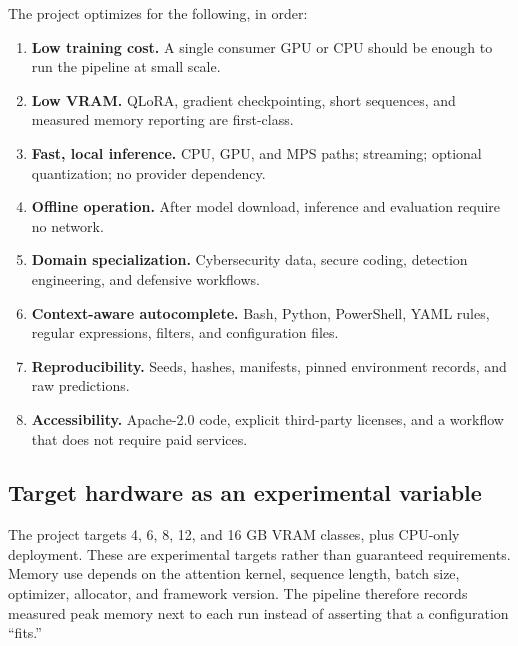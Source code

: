 The project optimizes for the following, in order:

\begin{enumerate}[leftmargin=1.4em]
  \item \textbf{Low training cost.} A single consumer GPU or CPU should be
  enough to run the pipeline at small scale.
  \item \textbf{Low VRAM.} QLoRA, gradient checkpointing, short sequences, and
  measured memory reporting are first-class.
  \item \textbf{Fast, local inference.} CPU, GPU, and MPS paths; streaming;
  optional quantization; no provider dependency.
  \item \textbf{Offline operation.} After model download, inference and
  evaluation require no network.
  \item \textbf{Domain specialization.} Cybersecurity data, secure coding,
  detection engineering, and defensive workflows.
  \item \textbf{Context-aware autocomplete.} Bash, Python, PowerShell, YAML
  rules, regular expressions, filters, and configuration files.
  \item \textbf{Reproducibility.} Seeds, hashes, manifests, pinned environment
  records, and raw predictions.
  \item \textbf{Accessibility.} Apache-2.0 code, explicit third-party licenses,
  and a workflow that does not require paid services.
\end{enumerate}

\subsection{Target hardware as an experimental variable}

The project targets 4, 6, 8, 12, and 16 GB VRAM classes, plus CPU-only
deployment. These are experimental targets rather than guaranteed requirements.
Memory use depends on the attention kernel, sequence length, batch size,
optimizer, allocator, and framework version. The pipeline therefore records
measured peak memory next to each run instead of asserting that a configuration
``fits.''
